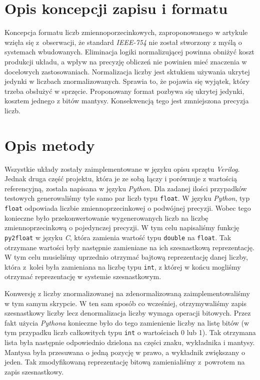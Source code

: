 \documentclass{article}
\begin{document}
\section{Opis koncepcji zapisu i formatu}
Koncepcja formatu liczb zmiennoporzecinkowych, zaproponowanego w artykule \cite{art:old} wzięła się z~obserwacji, że standard \emph{IEEE-754} nie został stworzony z myślą o systemach wbudowanych.
Eliminacja logiki normalizującej powinna obniżyć koszt produkcji układu, a wpływ na precyzję obliczeń nie powinien mieć znaczenia w docelowych zastosowaniach.
Normalizacja liczby jest sktukiem używania ukrytej jedynki w liczbach znormalizowanych.
Sprawia to, że pojawia się wyjątek, który trzeba obsłużyć w sprzęcie.
Proponowany format pozbywa się ukrytej jedynki, kosztem jednego z bitów mantysy.
Konsekwencją tego jest zmniejszona precyzja liczb.


\section{Opis metody}
Wszystkie układy zostały zaimplementowane w języku opisu sprzętu \emph{Verilog}.
Jednak druga część projektu, która je ze sobą łączy i porównuje z wartością referencyjną, została napisana w języku \emph{Python}.
Dla zadanej ilości przypadków testowych generowaliśmy tyle samo par liczb typu \texttt{float}.
W języku \emph{Python}, typ \texttt{float} odpowiada liczbie zmiennoprzecinkowej o podwójnej precyzji.
Wobec tego konieczne było przekonwertowanie wygenerowanych liczb na liczbę zmiennoprzecinkową o pojedynczej precyzji.
W tym celu napisaliśmy funkcję \texttt{py2float} w języku \emph{C}, która zamienia wartość typu \texttt{double} na \texttt{float}.
Tak otrzymane wartości były następnie zamieniane na ich szesnastkową reprezentację.
W tym celu musieliśmy uprzednio otrzymać bajtową reprezentację danej liczby, która z~kolei była zamieniana na liczbę typu \texttt{int}, z której w końcu mogliśmy otrzymać reprezentację w systemie szesnastkowym.

Konwersję z liczby znormalizowanej na zdenormalizowaną zaimplementowaliśmy w tym samym skrypcie.
W ten sam sposób co wcześniej, otrzymywaliśmy zapis szesnastkowy liczby lecz denormalizacja liczby wymaga operacji bitowych.
Przez fakt użycia \emph{Pythona} konieczne było do tego zamienienie liczby na listę bitów (w tym przypadku liczb całkowitych typu \texttt{int} o wartościach 0 lub 1).
Tak otrzymana lista była następnie odpowiednio dzielona na części znaku, wykładnika i mantysy.
Mantysa była przesuwana o jedną pozycję w prawo, a wykładnik zwiększany o jeden.
Tak zmodyfikowaną reprezentację bitową zamienialiśmy z~powrotem na zapis szesnastkowy.
\end{document}
